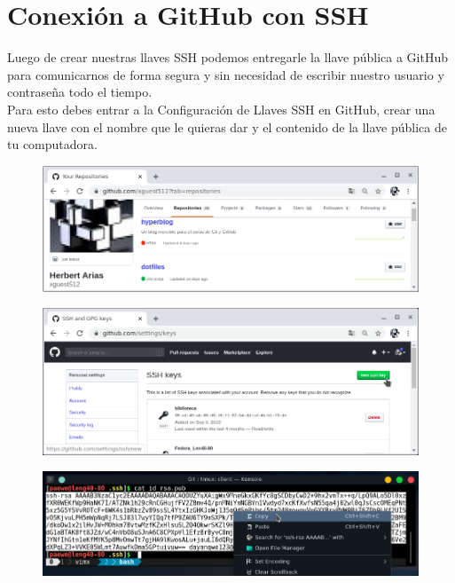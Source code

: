 \documentclass{article}
\begin{document}
\newpage
\section{Conexión a GitHub con SSH}%
Luego de crear nuestras llaves SSH podemos entregarle la llave pública a GitHub
para comunicarnos de forma segura y sin necesidad de escribir nuestro usuario y
contraseña todo el tiempo.\\

Para esto debes entrar a la Configuración de Llaves SSH en GitHub, crear una
nueva llave con el nombre que le quieras dar y el contenido de la llave pública
de tu computadora.\\

\begin{figure}[h!]
  \centering
  \includegraphics[scale=0.75]{./Pictures/222_repositorio.png}
\end{figure}

\begin{figure}[h!]
  \centering
  \includegraphics[scale=0.75]{./Pictures/223_new_key.png}
\end{figure}

\begin{figure}[h!]
  \centering
  \includegraphics[scale=0.75]{./Pictures/224_llave_publica.png}
\end{figure}
\end{document}

